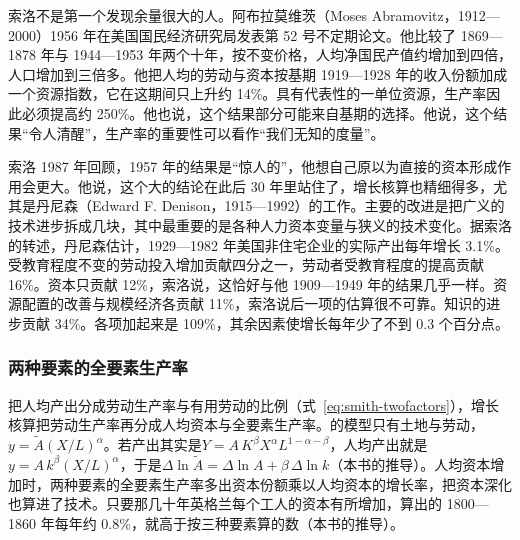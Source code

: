 索洛不是第一个发现余量很大的人。阿布拉莫维茨（Moses Abramovitz，1912—2000）1956 年在美国国民经济研究局发表第 52 号不定期论文\cite{abramovitz1956,loc40,gnd40}。他比较了 1869—1878 年与 1944—1953 年两个十年，按不变价格，人均净国民产值约增加到四倍，人口增加到三倍多\cite{abramovitz1956}。他把人均的劳动与资本按基期 1919—1928 年的收入份额加成一个资源指数，它在这期间只上升约 14\%\cite{abramovitz1956}。具有代表性的一单位资源，生产率因此必须提高约 250\%\cite{abramovitz1956}。他也说，这个结果部分可能来自基期的选择\cite{abramovitz1956}。他说，这个结果“令人清醒”，生产率的重要性可以看作“我们无知的度量”\cite{abramovitz1956}。

索洛 1987 年回顾，1957 年的结果是“惊人的”，他想自己原以为直接的资本形成作用会更大\cite{solow1987}。他说，这个大的结论在此后 30 年里站住了，增长核算也精细得多，尤其是丹尼森（Edward F. Denison，1915—1992）的工作\cite{solow1987,loc40,gnd40}。主要的改进是把广义的技术进步拆成几块，其中最重要的是各种人力资本变量与狭义的技术变化\cite{solow1987}。据索洛的转述，丹尼森估计，1929—1982 年美国非住宅企业的实际产出每年增长 3.1\%\cite{solow1987}。受教育程度不变的劳动投入增加贡献四分之一，劳动者受教育程度的提高贡献 16\%\cite{solow1987}。资本只贡献 12\%，索洛说，这恰好与他 1909—1949 年的结果几乎一样\cite{solow1987}。资源配置的改善与规模经济各贡献 11\%，索洛说后一项的估算很不可靠\cite{solow1987}。知识的进步贡献 34\%\cite{solow1987}。各项加起来是 109\%，其余因素使增长每年少了不到 0.3 个百分点\cite{solow1987}。

\subsubsection{两种要素的全要素生产率}

把人均产出分成劳动生产率与有用劳动的比例（式~\eqref{eq:smith-twofactors}），增长核算把劳动生产率再分成人均资本与全要素生产率。的模型只有土地与劳动，$y=\tilde A(X/L)^{\alpha}$。若产出其实是$Y=A\,K^{\beta}X^{\alpha}L^{1-\alpha-\beta}$，人均产出就是$y=A\,k^{\beta}(X/L)^{\alpha}$，于是$\Delta\ln\tilde A=\Delta\ln A+\beta\,\Delta\ln k$（本书的推导）。人均资本增加时，两种要素的全要素生产率多出资本份额乘以人均资本的增长率，把资本深化也算进了技术。只要那几十年英格兰每个工人的资本有所增加，算出的 1800—1860 年每年约 0.8\%，就高于按三种要素算的数（本书的推导）。

